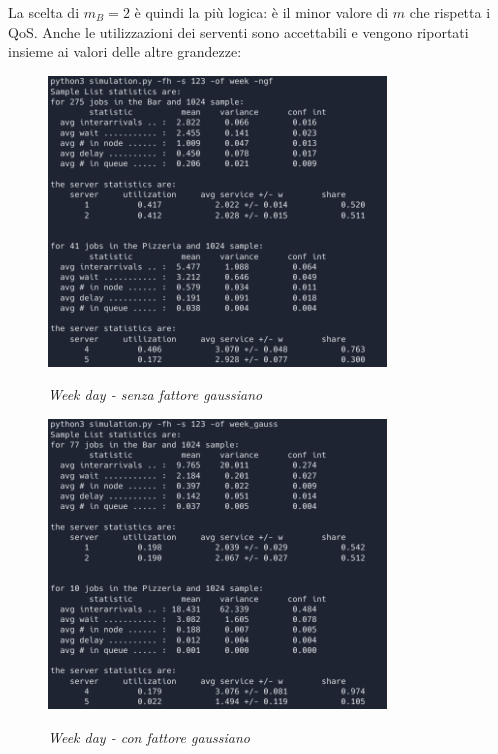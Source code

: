 \documentclass[a4paper, 12pt]{article}
\begin{document}
La scelta di $m_B = 2$ è quindi la più logica: è il minor valore di $m$ che rispetta i QoS. Anche le utilizzazioni dei serventi sono accettabili e vengono riportati insieme ai valori delle altre grandezze:\\
\begin{minipage}{0.5\textwidth}
\begin{figure}[H]
\centering
\includegraphics[width=0.8\textwidth]{finite_horizont_output_week_ngf}

\textit{Week day - senza fattore gaussiano}
\end{figure}
\end{minipage}
\begin{minipage}{0.5\textwidth}
\begin{figure}[H]
\centering
\includegraphics[width=0.8\textwidth]{finite_horizont_output_week_g}

\textit{Week day - con fattore gaussiano}
\end{figure}
\end{minipage}
\end{document}
